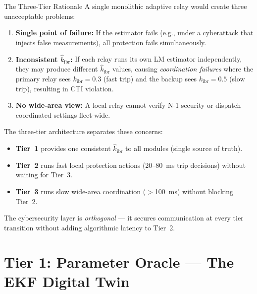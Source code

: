\documentclass[12pt,a4paper]{article}
\newcommand{\kibr}{k_\mathrm{ibr}}
\newcommand{\kibrhat}{\hat{k}_\mathrm{ibr}}
\begin{document}
\begin{archbox}{The Three-Tier Rationale}
A single monolithic adaptive relay would create three unacceptable problems:
\begin{enumerate}[nosep]
  \item \textbf{Single point of failure:} If the estimator fails (e.g., under
        a cyberattack that injects false measurements), all protection fails
        simultaneously.
  \item \textbf{Inconsistent $\kibrhat$:} If each relay runs its own LM
        estimator independently, they may produce different $\kibrhat$ values,
        causing \emph{coordination failures} where the primary relay sees
        $\kibr = 0.3$ (fast trip) and the backup sees $\kibr = 0.5$ (slow trip),
        resulting in CTI violation.
  \item \textbf{No wide-area view:} A local relay cannot verify N-1 security
        or dispatch coordinated settings fleet-wide.
\end{enumerate}

The three-tier architecture separates these concerns:
\begin{itemize}[nosep]
  \item \textbf{Tier~1} provides one consistent $\kibrhat$ to all modules
        (single source of truth).
  \item \textbf{Tier~2} runs fast local protection actions (20--80~ms trip
        decisions) without waiting for Tier~3.
  \item \textbf{Tier~3} runs slow wide-area coordination ($>$100~ms) without
        blocking Tier~2.
\end{itemize}
The cybersecurity layer is \emph{orthogonal} --- it secures communication
at every tier transition without adding algorithmic latency to Tier~2.
\end{archbox}

\section{Tier 1: Parameter Oracle --- The EKF Digital Twin}
\end{document}
